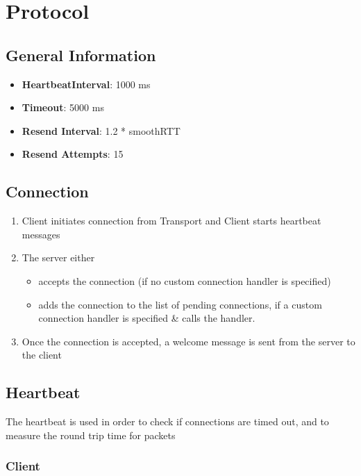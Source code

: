 \chapter{Protocol}

\section{General Information}

\begin{itemize}
	\item \textbf{HeartbeatInterval}: 1000 ms
	\item \textbf{Timeout}: 5000 ms
	\item \textbf{Resend Interval}: 1.2 * smoothRTT
	\item \textbf{Resend Attempts}: 15
\end{itemize}

\section{Connection}

\begin{enumerate}
	\item Client initiates connection from Transport and Client starts heartbeat messages
	\item The server either
	\begin{itemize}
		\item accepts the connection (if no custom connection handler is specified)
		\item adds the connection to the list of pending connections, if a custom connection handler is specified \& calls the handler.
	\end{itemize}
	\item Once the connection is accepted, a welcome message is sent from the server to the client
\end{enumerate}

\section{Heartbeat}

The heartbeat is used in order to check if connections are timed out, and to measure the round trip time for packets

\subsection{Client}

